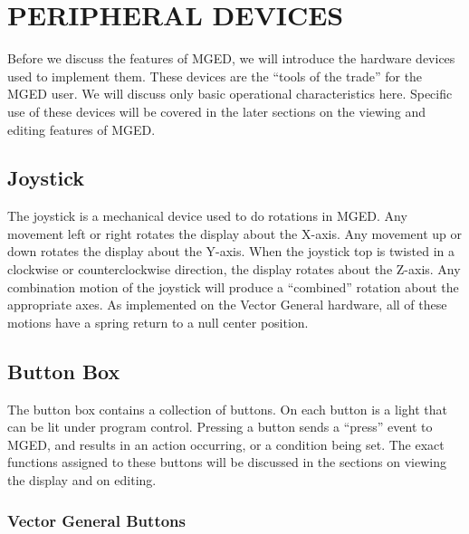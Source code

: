 \chapter{PERIPHERAL DEVICES}

Before we discuss the features of MGED, we will introduce
the hardware devices used to implement them.
These devices are the ``tools of the trade'' for the MGED user.
We will discuss only basic operational characteristics here.
Specific use of these devices will be covered in the later sections
on the viewing and editing features of MGED.

\section{Joystick}

The joystick is a mechanical device used to do rotations in MGED.
Any movement left or right rotates the display about the
X-axis.  Any movement up or down rotates the display
about the Y-axis.  When the joystick top is twisted in a clockwise or
counterclockwise direction, the display rotates about the Z-axis.
Any combination motion of the joystick will produce a ``combined''
rotation about the appropriate axes.
As implemented on the Vector General hardware,
all of these motions have a spring return to a null center position.

\section{Button Box}

The button box contains a collection of buttons.
On each button is a light that can be lit under program control.
Pressing a button sends a ``press'' event to MGED,
and results in an action occurring, or a condition being set.
The exact functions assigned to these buttons will be discussed
in the sections on viewing the display and on editing.

\subsection{Vector General Buttons}


